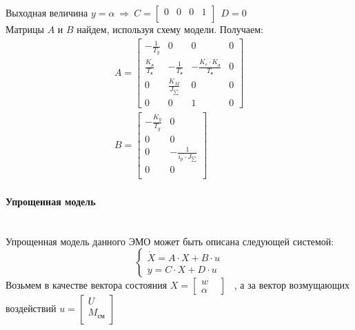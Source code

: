 \documentclass[a4paper,12pt]{article}
\begin{document}
	\noindent Выходная величина $y=\alpha ~\Rightarrow~ C=\begin{bmatrix}
		0 & 0 & 0 & 1\\ \end{bmatrix} ~~D=0$ \\
		Матрицы $A$ и $B$ найдем, используя схему модели. Получаем:\\ 
		\begin{gather}
		\displaystyle A=\begin{bmatrix}
		-\frac{1}{T_y} & 0 & 0 & 0\\
		\frac{K_{\text{д}}}{T_{\text{я}}} & -\frac{1}{T_{\text{я}}} & -\frac{K_e \cdot K_{\text{д}}}{T_{\text{я}}} & 0\\
		0 & \frac{K_M}{J_{\sum}} & 0 & 0\\
		0 & 0 & 1 & 0
		\end{bmatrix} 
		\\ B=\begin{bmatrix}
		-\frac{K_y}{T_y} & 0 \\
		0 & 0 \\
		0 & -\frac{1}{i_p \cdot J_{\sum}} \\
		0 & 0\\
		\end{bmatrix}
		\end{gather}
		
		
		
		\paragraph{Упрощенная модель}~\\
		Упрощенная модель данного ЭМО может быть описана следующей системой:\\
		\begin{equation}
		\begin{cases}
		\dot{X}=A\cdot X + B\cdot u 
		\\
		y = C\cdot X + D\cdot u
		\end{cases}
		\end{equation}
		Возьмем в качестве вектора состояния $X=\begin{bmatrix}
		w &\\
		\alpha
		\end{bmatrix}$
		~, а за вектор возмущающих воздействий $u=\begin{bmatrix}
		U \\
		M_{\text{см}}\\ \end{bmatrix}$ \\
		
\end{document}
